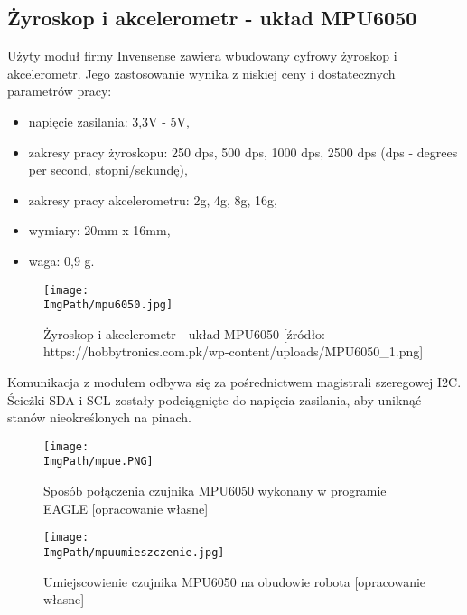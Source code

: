 \documentclass[a4paper,12pt,twoside,openany]{report}
\newcommand{\ImgPath}{.}
\begin{document}
\subsection{Żyroskop i akcelerometr - układ MPU6050}

Użyty moduł firmy Invensense zawiera wbudowany cyfrowy żyroskop i akcelerometr. Jego zastosowanie wynika z niskiej ceny i dostatecznych parametrów pracy:
\begin{itemize}
\item napięcie zasilania: 3,3V - 5V,
\item zakresy pracy żyroskopu: 250 dps, 500 dps, 1000 dps, 2500 dps (dps - degrees per second, stopni/sekundę),
\item zakresy pracy akcelerometru: 2g, 4g, 8g, 16g,
\item wymiary: 20mm x 16mm,
\item waga: 0,9 g.
\end{itemize}

\begin{figure}[!htbp]
	\begin{center}
\centering
\texttt{[image: \\ImgPath/mpu6050.jpg]}
\end{center}
	\caption{Żyroskop i akcelerometr - układ MPU6050 [źródło: https://hobbytronics.com.pk/wp-content/uploads/MPU6050\_1.png]}
	\label{schematKomunikacji}
\end{figure}

Komunikacja z modułem odbywa się za pośrednictwem magistrali szeregowej I2C. Ścieżki SDA i SCL zostały podciągnięte do napięcia zasilania, aby uniknąć stanów nieokreślonych na pinach. 

\begin{figure}[!htbp]
	\begin{center}
\centering
\texttt{[image: \\ImgPath/mpue.PNG]}
\end{center}
	\caption{Sposób połączenia czujnika MPU6050 wykonany w programie EAGLE [opracowanie własne]}
	\label{schematKomunikacji}
\end{figure}

\begin{figure}[!htbp]
	\begin{center}
\centering
\texttt{[image: \\ImgPath/mpuumieszczenie.jpg]}
\end{center}
	\caption{Umiejscowienie czujnika MPU6050 na obudowie robota [opracowanie własne]}
	\label{schematKomunikacji}
\end{figure}
\end{document}
